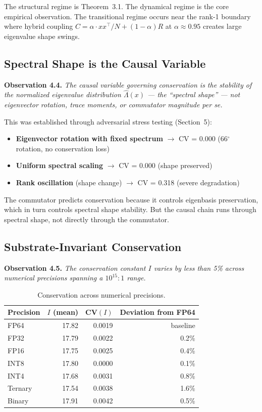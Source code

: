 \documentclass[11pt]{article}
\begin{document}
The structural regime is Theorem~3.1. The dynamical regime is the core empirical observation. The transitional regime occurs near the rank-1 boundary where hybrid coupling $C = \alpha \cdot xx^\top/N + (1-\alpha)R$ at $\alpha \approx 0.95$ creates large eigenvalue shape swings.

\subsection{Spectral Shape is the Causal Variable}

\textbf{Observation 4.4.} \textit{The causal variable governing conservation is the stability of the normalized eigenvalue distribution $\hat{\Lambda}(x)$ --- the ``spectral shape'' --- not eigenvector rotation, trace moments, or commutator magnitude per se.}

This was established through adversarial stress testing (Section~5):

\begin{itemize}
  \item \textbf{Eigenvector rotation with fixed spectrum} $\to$ CV = 0.000 (66$^\circ$ rotation, no conservation loss)
  \item \textbf{Uniform spectral scaling} $\to$ CV = 0.000 (shape preserved)
  \item \textbf{Rank oscillation} (shape change) $\to$ CV = 0.318 (severe degradation)
\end{itemize}

The commutator predicts conservation because it controls eigenbasis preservation, which in turn controls spectral shape stability. But the causal chain runs through spectral shape, not directly through the commutator.

\subsection{Substrate-Invariant Conservation}

\textbf{Observation 4.5.} \textit{The conservation constant $I$ varies by less than 5\% across numerical precisions spanning a $10^{15}\!:\!1$ range.}

\begin{table}[h]
  \centering
  \caption{Conservation across numerical precisions.}
  \label{tab:substrate}
  \begin{tabular}{lrrr}
    \toprule
    Precision & $I$ (mean) & CV$(I)$ & Deviation from FP64 \\
    \midrule
    FP64   & 17.82 & 0.0019 & baseline \\
    FP32   & 17.79 & 0.0022 & 0.2\% \\
    FP16   & 17.75 & 0.0025 & 0.4\% \\
    INT8   & 17.80 & 0.0000 & 0.1\% \\
    INT4   & 17.68 & 0.0031 & 0.8\% \\
    Ternary & 17.54 & 0.0038 & 1.6\% \\
    Binary & 17.91 & 0.0042 & 0.5\% \\
    \bottomrule
  \end{tabular}
\end{table}
\end{document}
